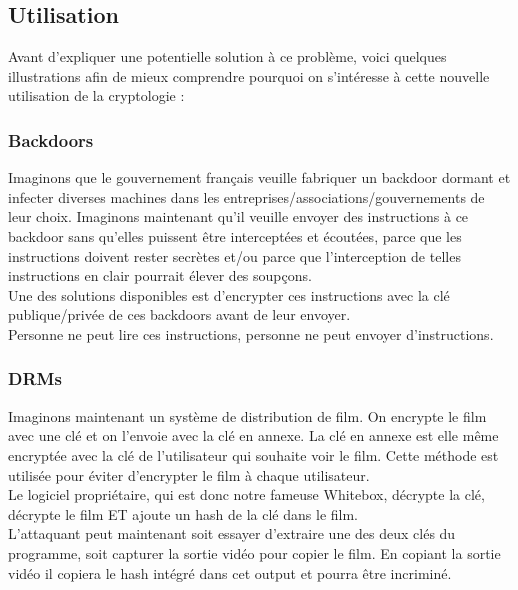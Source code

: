 \documentclass[a4paper,12pt]{article}
\begin{document}
\subsection{Utilisation}

Avant d'expliquer une potentielle solution à ce problème, voici quelques illustrations afin de mieux comprendre pourquoi on s'intéresse à cette nouvelle utilisation de la cryptologie :\\


\subsubsection{Backdoors}

Imaginons que le gouvernement français veuille fabriquer un backdoor dormant et infecter diverses machines dans les entreprises/associations/gouvernements de leur choix. Imaginons maintenant qu'il veuille envoyer des instructions à ce backdoor sans qu'elles puissent être interceptées et écoutées, parce que les instructions doivent rester secrètes et/ou parce que l'interception de telles instructions en clair pourrait élever des soupçons.\\

Une des solutions disponibles est d'encrypter ces instructions avec la clé publique/privée de ces backdoors avant de leur envoyer.\\

Personne ne peut lire ces instructions, personne ne peut envoyer d'instructions.

\subsubsection{DRMs}

Imaginons maintenant un système de distribution de film. On encrypte le film avec une clé et on l'envoie avec la clé en annexe. La clé en annexe est elle même encryptée avec la clé de l'utilisateur qui souhaite voir le film. Cette méthode est utilisée pour éviter d'encrypter le film à chaque utilisateur.\\
Le logiciel propriétaire, qui est donc notre fameuse Whitebox, décrypte la clé, décrypte le film ET ajoute un hash de la clé dans le film.\\
L'attaquant peut maintenant soit essayer d'extraire une des deux clés du programme, soit capturer la sortie vidéo pour copier le film. En copiant la sortie vidéo il copiera le hash intégré dans cet output et pourra être incriminé.
\end{document}
